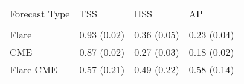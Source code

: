 \begin{tabular}{llll}
\toprule
Forecast Type & TSS & HSS & AP \\
 &  &  &  \\
\midrule
Flare & 0.93 (0.02) & 0.36 (0.05) & 0.23 (0.04) \\
CME & 0.87 (0.02) & 0.27 (0.03) & 0.18 (0.02) \\
Flare-CME & 0.57 (0.21) & 0.49 (0.22) & 0.58 (0.14) \\
\bottomrule
\end{tabular}
